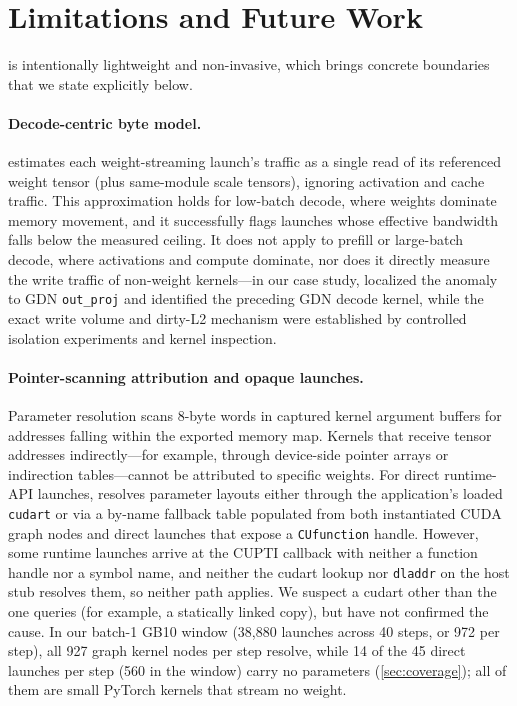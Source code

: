 \section{Limitations and Future Work}\label{sec:limits}

\sys{} is intentionally lightweight and non-invasive, which brings concrete boundaries that
we state explicitly below.

\paragraph{Decode-centric byte model.}
\sys{} estimates each weight-streaming launch's traffic as a single read of its referenced
weight tensor (plus same-module scale tensors), ignoring activation and cache traffic.
This approximation holds for low-batch decode, where weights dominate memory movement,
and it successfully flags launches whose effective bandwidth falls below the measured
ceiling.
It does not apply to prefill or large-batch decode, where activations and compute dominate,
nor does it directly measure the write traffic of non-weight kernels---in our case study,
\sys{} localized the anomaly to GDN \texttt{out\_proj} and identified the preceding GDN
decode kernel, while the exact write volume and dirty-L2 mechanism were established by
controlled isolation experiments and kernel inspection.

\paragraph{Pointer-scanning attribution and opaque launches.}
Parameter resolution scans 8-byte words in captured kernel argument buffers for addresses
falling within the exported memory map.
Kernels that receive tensor addresses indirectly---for example, through device-side pointer
arrays or indirection tables---cannot be attributed to specific weights.
For direct runtime-API launches, \sys{} resolves parameter layouts either through the
application's loaded \texttt{cudart} or via a by-name fallback table populated from both
instantiated CUDA graph nodes and direct launches that expose a \texttt{CUfunction} handle.
However, some runtime launches arrive at the CUPTI callback with neither a function handle
nor a symbol name, and neither the cudart lookup nor \texttt{dladdr} on the host stub
resolves them, so neither path applies. We suspect a cudart other than the one \sys{} queries
(for example, a statically linked copy), but have not confirmed the cause.
In our batch-1 GB10 window (38,880 launches across 40 steps, or 972 per step), all 927
graph kernel nodes per step resolve, while 14 of the 45 direct launches per step (560 in
the window) carry no parameters (\cref{sec:coverage}); all of them are small PyTorch kernels that
stream no weight.

